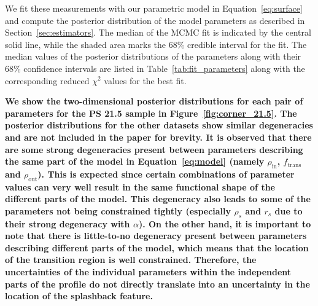 \documentclass[iop, apjl, twocolappendix, numberedappendix]{emulateapj}
\begin{document}
We fit these measurements with our parametric model in Equation~\ref{eq:surface}
and compute the posterior distribution of the model parameters
as described in Section~\ref{sec:estimators}. The
median of the MCMC fit is indicated by the central solid line, while
the shaded area marks the 68\% credible interval for the fit. The
median values of the posterior distributions of the parameters along
with their 68\% confidence intervals are listed in
Table~\ref{tab:fit_parameters} along with the corresponding reduced
$\chi^2$ values for the best fit.

\textbf{We show the two-dimensional posterior distributions for each pair of
parameters for the PS 21.5 sample in Figure~\ref{fig:corner_21.5}. The
posterior distributions for the other datasets show similar degeneracies and
are not included in the paper for brevity.
It is observed that there are some strong degeneracies present between
parameters describing the same part of the model in Equation~\ref{eq:model}
(namely $\rho_{\mathrm{in}}$, $f_{\mathrm{trans}}$ and $\rho_{\mathrm{out}}$).
This is expected since certain combinations of parameter values can
very well result in the same functional shape of the different parts of
the model. This degeneracy also leads to some of the parameters not being
constrained tightly (especially $\rho_s$ and $r_s$ due to their strong degeneracy
with $\alpha$). On the other hand, it is important to note that there is
little-to-no degeneracy present between parameters describing different parts
of the model, which means that the location of the transition region is well
constrained. Therefore, the uncertainties of the individual parameters within
the independent parts of the profile do not directly translate into an
uncertainty in the location of the splashback feature.}
\end{document}
